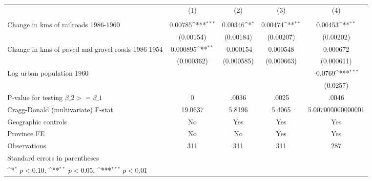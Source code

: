 {
\def\sym#1{\ifmmode^{#1}\else\(^{#1}\)\fi}
\begin{tabular}{l*{4}{c}}
\hline\hline
                &\multicolumn{1}{c}{(1)}&\multicolumn{1}{c}{(2)}&\multicolumn{1}{c}{(3)}&\multicolumn{1}{c}{(4)}\\
                &\multicolumn{1}{c}{}&\multicolumn{1}{c}{}&\multicolumn{1}{c}{}&\multicolumn{1}{c}{}\\
\hline
Change in kms of railroads 1986-1960&  0.00785\sym{***}&  0.00346\sym{*}  &  0.00474\sym{**} &  0.00453\sym{**} \\
                &(0.00154)         &(0.00184)         &(0.00207)         &(0.00202)         \\
[1em]
Change in kms of paved and gravel roads 1986-1954& 0.000895\sym{**} &-0.000154         & 0.000548         & 0.000672         \\
                &(0.000362)         &(0.000585)         &(0.000663)         &(0.000611)         \\
[1em]
Log urban population 1960&                  &                  &                  &  -0.0769\sym{***}\\
                &                  &                  &                  & (0.0257)         \\
\hline
P-value for testing $\beta\_{2} >= \beta\_{1}$&        0         &    .0036         &    .0025         &    .0046         \\
Cragg-Donald (multivariate) F-stat&  19.0637         &   5.8196         &   5.4065         &5.007000000000001         \\
Geographic controls&       No         &      Yes         &      Yes         &      Yes         \\
Province FE     &       No         &       No         &      Yes         &      Yes         \\
Observations    &      311         &      311         &      311         &      287         \\
\hline\hline
\multicolumn{5}{l}{\footnotesize Standard errors in parentheses}\\
\multicolumn{5}{l}{\footnotesize \sym{*} \(p<0.10\), \sym{**} \(p<0.05\), \sym{***} \(p<0.01\)}\\
\end{tabular}
}
